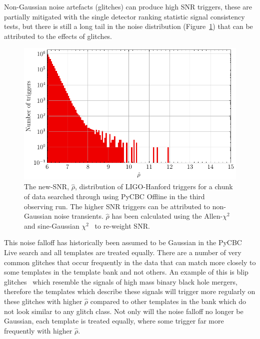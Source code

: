 Non-Gaussian noise artefacts (glitches) can produce high SNR triggers, these are partially mitigated with the single detector ranking statistic signal consistency tests, but there is still a long tail in the noise distribution (Figure~\ref{5:fig:H1_long_tails}) that can be attributed to the effects of glitches.
%
\begin{figure}
    \centering
    \includegraphics[width=1.0\linewidth]{images/5_pycbclive/plots/H1-newsnr_trigs.pdf}
    \caption{The new-SNR, $\hat{\rho}$, distribution of LIGO-Hanford triggers for a chunk of data searched through using PyCBC Offline in the third observing run. The higher SNR triggers can be attributed to non-Gaussian noise transients. $\hat{\rho}$ has been calculated using the Allen-$\chi^{2}$~\cite{Allen_Chi:2005} and sine-Gaussian $\chi^{2}$~\cite{PyCBC_sg:2018} to re-weight SNR.}
    \label{5:fig:H1_long_tails}
\end{figure}
%
This noise falloff has historically been assumed to be Gaussian in the PyCBC Live search and all templates are treated equally. There are a number of very common glitches that occur frequently in the data that can match more closely to some templates in the template bank and not others. An example of this is blip glitches~\cite{blips:2019} which resemble the \gwadj signals of high mass binary black hole mergers, therefore the templates which describe these signals will trigger more regularly on these glitches with higher $\hat{\rho}$ compared to other templates in the bank which do not look similar to any glitch class. Not only will the noise falloff no longer be Gaussian, each template is treated equally, where some trigger far more frequently with higher $\hat{\rho}$.

